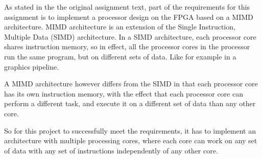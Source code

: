 As stated in the the original assignment text, part of the requirements for this
assignment is to implement a processor design on the FPGA based on a MIMD
architecture. MIMD architecture is an extension of the Single Instruction,
Multiple Data (SIMD) architecture. In a SIMD architecture, each processor core
shares instruction memory, so in effect, all the processor cores in the
processor run the same program, but on different sets of data. Like for example
in a graphics pipeline.

A MIMD architecture however differs from the SIMD in that each processor core
has its own instruction memory, with the effect that each processor core can
perform a different task, and execute it on a different set of data than any
other core.

So for this project to successfully meet the requirements, it has to implement
an architecture with multiple processing cores, where each core can work on any
set of data with any set of instructions independently of any other core.
